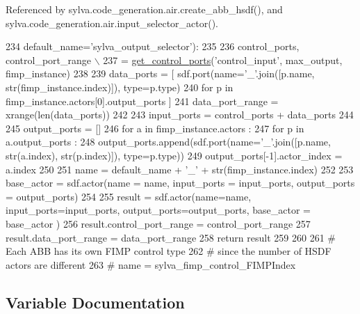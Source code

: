 Referenced by sylva.\+code\+\_\+generation.\+air.\+create\+\_\+abb\+\_\+hsdf(), and sylva.\+code\+\_\+generation.\+air.\+input\+\_\+selector\+\_\+actor().


\begin{DoxyCode}
234   default\_name=\textcolor{stringliteral}{'sylva\_output\_selector'}):
235 
236   control\_ports, control\_port\_range \(\backslash\)
237   = \hyperlink{namespacesylva_1_1code__generation_1_1air_a71d379169f113b29c326aa9f70c6d47e}{get\_control\_ports}(\textcolor{stringliteral}{'control\_input'}, max\_output, fimp\_instance)
238 
239   data\_ports = [ sdf.port(name=\textcolor{stringliteral}{'\_'}.join([p.name, str(fimp\_instance.index)]), type=p.type)
240                    \textcolor{keywordflow}{for} p \textcolor{keywordflow}{in} fimp\_instance.actors[0].output\_ports ]
241   data\_port\_range = xrange(len(data\_ports))
242 
243   input\_ports = control\_ports + data\_ports
244 
245   output\_ports = []
246   \textcolor{keywordflow}{for} a \textcolor{keywordflow}{in} fimp\_instance.actors :
247     \textcolor{keywordflow}{for} p \textcolor{keywordflow}{in} a.output\_ports :
248       output\_ports.append(sdf.port(name=\textcolor{stringliteral}{'\_'}.join([p.name, str(a.index), str(p.index)]), type=p.type))
249       output\_ports[-1].actor\_index = a.index
250 
251   name = default\_name + \textcolor{stringliteral}{'\_'} + str(fimp\_instance.index)
252 
253   base\_actor = sdf.actor(name = name, input\_ports = input\_ports, output\_ports = output\_ports)
254 
255   result = sdf.actor(name=name, input\_ports=input\_ports, output\_ports=output\_ports, base\_actor = base\_actor
      )
256   result.control\_port\_range = control\_port\_range
257   result.data\_port\_range = data\_port\_range
258   \textcolor{keywordflow}{return} result
259 
260 
261 \textcolor{comment}{# Each ABB has its own FIMP control type}
262 \textcolor{comment}{# since the number of HSDF actors are different}
263 \textcolor{comment}{# name = sylva\_fimp\_control\_FIMPIndex}
\end{DoxyCode}


\subsection{Variable Documentation}
\mbox{\label{namespacesylva_1_1code__generation_1_1air_adfbe6169cf7f46d110aa5f8a54023255}} 
